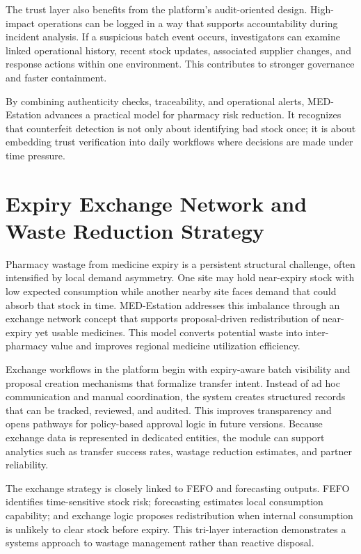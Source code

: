 \documentclass[12pt,a4paper]{report}
\begin{document}
The trust layer also benefits from the platform’s audit-oriented design. High-impact operations can be logged in a way that supports accountability during incident analysis. If a suspicious batch event occurs, investigators can examine linked operational history, recent stock updates, associated supplier changes, and response actions within one environment. This contributes to stronger governance and faster containment.

By combining authenticity checks, traceability, and operational alerts, MED-Estation advances a practical model for pharmacy risk reduction. It recognizes that counterfeit detection is not only about identifying bad stock once; it is about embedding trust verification into daily workflows where decisions are made under time pressure.

\chapter{Expiry Exchange Network and Waste Reduction Strategy}
Pharmacy wastage from medicine expiry is a persistent structural challenge, often intensified by local demand asymmetry. One site may hold near-expiry stock with low expected consumption while another nearby site faces demand that could absorb that stock in time. MED-Estation addresses this imbalance through an exchange network concept that supports proposal-driven redistribution of near-expiry yet usable medicines. This model converts potential waste into inter-pharmacy value and improves regional medicine utilization efficiency.

Exchange workflows in the platform begin with expiry-aware batch visibility and proposal creation mechanisms that formalize transfer intent. Instead of ad hoc communication and manual coordination, the system creates structured records that can be tracked, reviewed, and audited. This improves transparency and opens pathways for policy-based approval logic in future versions. Because exchange data is represented in dedicated entities, the module can support analytics such as transfer success rates, wastage reduction estimates, and partner reliability.

The exchange strategy is closely linked to FEFO and forecasting outputs. FEFO identifies time-sensitive stock risk; forecasting estimates local consumption capability; and exchange logic proposes redistribution when internal consumption is unlikely to clear stock before expiry. This tri-layer interaction demonstrates a systems approach to wastage management rather than reactive disposal.
\end{document}
